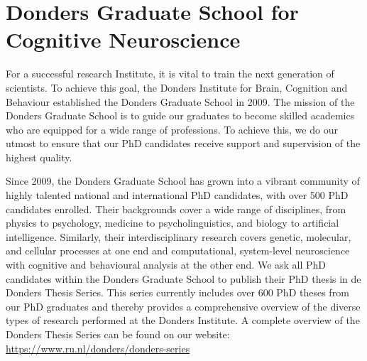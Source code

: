 \chapter*{Donders Graduate School for Cognitive Neuroscience}
\label{ch:dgn}

For a successful research Institute, it is vital to train the next generation of scientists. To achieve this goal, the Donders Institute for Brain, Cognition and Behaviour established the Donders Graduate School in 2009. The mission of the Donders Graduate School is to guide our graduates to become skilled academics who are equipped for a wide range of professions. To achieve this, we do our utmost to ensure that our PhD candidates receive support and supervision of the highest quality.

Since 2009, the Donders Graduate School has grown into a vibrant community of highly talented national and international PhD candidates, with over 500 PhD candidates enrolled. Their backgrounds cover a wide range of disciplines, from physics to psychology, medicine to psycholinguistics, and biology to artificial intelligence. Similarly, their interdisciplinary research covers genetic, molecular, and cellular processes at one end and computational, system-level neuroscience with cognitive and behavioural analysis at the other end. We ask all PhD candidates within the Donders Graduate School to publish their PhD thesis in de Donders Thesis Series. This series currently includes over 600 PhD theses from our PhD graduates and thereby provides a comprehensive overview of the diverse types of research performed at the Donders Institute. A complete overview of the Donders Thesis Series can be found on our website: \url{https://www.ru.nl/donders/donders-series}

